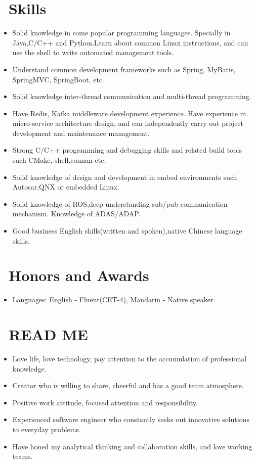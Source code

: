 \documentclass{resume}
\begin{document}
\section{\faCogs\ Skills}
\begin{itemize}[parsep=0.5ex]
  \item Solid knowledge in some popular programming languages. Specially in Java,C\arraybackslash/C++ and Python.Learn about common Linux instructions, and can use the shell to write automated management tools.
  \item Understand common development frameworks such as Spring, MyBatis, SpringMVC, SpringBoot, etc.
  \item Solid knowledge inter-thread communication and multi-thread programming.
  \item Have Redis, Kafka middleware development experience. Have experience in micro-service architecture design, and can independently carry out project development and maintenance management.
  \item Strong C\arraybackslash/C++ programming and debugging skills and related build tools such CMake, shell,connan etc.
  \item Solid knowledge of design and development in embed environments such Autosar,QNX or 
  embedded Linux.
  \item Solid knowledge of ROS,deep understanding sub/pub communication mechanism. Knowledge of ADAS\arraybackslash/ADAP.
  \item Good business English skills(written and spoken),native Chinese language skills.
\end{itemize}

\section{\faHeartO\ Honors and Awards}
\begin{itemize}[parsep=0.5ex]
  \item Languages: English - Fluent(CET-4), Mandarin - Native speaker.
\end{itemize}

\section{\faUsers\ READ ME}
\begin{itemize}[parsep=0.5ex]
  \item Love life, love technology, pay attention to the accumulation of professional knowledge.
  \item Creator who is willing to share, cheerful and has a good team atmosphere.
  \item Positive work attitude, focused attention and responsibility.
  \item Experienced software engineer who constantly seeks out innovative solutions to everyday problems.
  \item Have honed my analytical thinking and collaboration skills, and love working teams.
\end{itemize}
\end{document}
